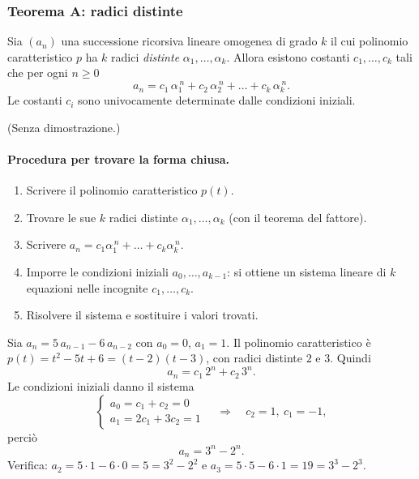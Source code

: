 \documentclass[11pt,a4paper]{article}
\begin{document}
\subsubsection{Teorema A: radici distinte}

\begin{teorema}[A]
Sia $(a_n)$ una successione ricorsiva lineare omogenea di grado $k$ il cui
polinomio caratteristico $p$ ha $k$ radici \emph{distinte}
$\alpha_1, \dots, \alpha_k$. Allora esistono costanti
$c_1, \dots, c_k$ tali che per ogni $n \geq 0$
\[
  a_n = c_1\, \alpha_1^{\,n} + c_2\, \alpha_2^{\,n} + \dots + c_k\, \alpha_k^{\,n} .
\]
Le costanti $c_i$ sono univocamente determinate dalle condizioni iniziali.
\end{teorema}

(Senza dimostrazione.)

\paragraph{Procedura per trovare la forma chiusa.}
\begin{enumerate}
  \item Scrivere il polinomio caratteristico $p(t)$.
  \item Trovare le sue $k$ radici distinte $\alpha_1, \dots, \alpha_k$
        (con il teorema del fattore).
  \item Scrivere $a_n = c_1 \alpha_1^{\,n} + \dots + c_k \alpha_k^{\,n}$.
  \item Imporre le condizioni iniziali $a_0, \dots, a_{k-1}$: si ottiene un
        sistema lineare di $k$ equazioni nelle incognite $c_1, \dots, c_k$.
  \item Risolvere il sistema e sostituire i valori trovati.
\end{enumerate}

\begin{esempio}
Sia $a_n = 5\, a_{n-1} - 6\, a_{n-2}$ con $a_0 = 0$, $a_1 = 1$. Il polinomio
caratteristico è $p(t) = t^2 - 5t + 6 = (t - 2)(t - 3)$, con radici distinte
$2$ e $3$. Quindi
\[
  a_n = c_1\, 2^n + c_2\, 3^n .
\]
Le condizioni iniziali danno il sistema
\[
  \begin{cases}
    a_0 = c_1 + c_2 = 0 \\
    a_1 = 2c_1 + 3c_2 = 1
  \end{cases}
  \quad\Longrightarrow\quad c_2 = 1,\ c_1 = -1 ,
\]
perciò
\[
  a_n = 3^n - 2^n .
\]
Verifica: $a_2 = 5 \cdot 1 - 6 \cdot 0 = 5 = 3^2 - 2^2$ e
$a_3 = 5 \cdot 5 - 6 \cdot 1 = 19 = 3^3 - 2^3$.
\end{esempio}
\end{document}
